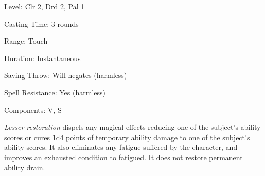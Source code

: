 
\begin{description*}
\item[Level:] Clr 2, Drd 2, Pal 1
\item[Casting Time:] 3 rounds
\item[Range:] Touch
\item[Duration:] Instantaneous
\item[Saving Throw:] Will negates (harmless)
\item[Spell Resistance:] Yes (harmless)
\item[Components:] V, S
\end{description*}

\textit{Lesser restoration} dispels any magical effects reducing one of the subject's
ability scores or cures 1d4 points of temporary ability damage to one of the subject's
ability scores. It also eliminates any fatigue suffered by the character, and improves
an exhausted condition to fatigued. It does not restore permanent ability drain.